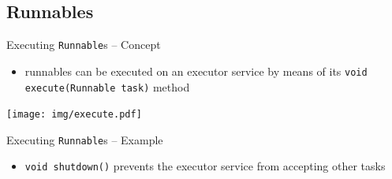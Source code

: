 \documentclass[presentation]{beamer}\mode<presentation>{\usetheme{AMSBolognaFC}}
\begin{document}
\subsection{Runnables}

\begin{frame}[c,allowframebreaks]{Executing \texttt{Runnable}s -- Concept}

	

	\framebreak

	\begin{itemize}
		\item runnables can be \alert{executed} on an executor service by means of its \texttt{void execute(Runnable task)} method
	\end{itemize}
	\begin{center}
		\texttt{[image: img/execute.pdf]}
	\end{center}

\end{frame}

\begin{frame}[c]{Executing \texttt{Runnable}s -- Example}

	

	\vfill

	\begin{itemize}
		\item \texttt{void shutdown()} prevents the executor service from accepting other tasks
	\end{itemize}

\end{frame}
\end{document}
